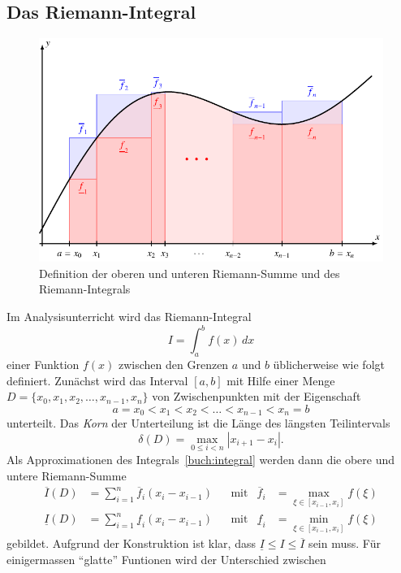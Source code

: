 \subsection{Das Riemann-Integral
\label{buch:subsection:riemann}}
\begin{figure}
\centering
\includegraphics{chapters/40-integration/figures/riemann.pdf}
\caption{Definition der oberen und unteren Riemann-Summe und des
Riemann-Integrals
\label{buch:figure:riemann}}
\end{figure}
Im Analysisunterricht wird das Riemann-Integral
\begin{equation}
I = \int_a^b f(x)\,dx
\label{buch:integral}
\end{equation}
einer Funktion $f(x)$ zwischen den Grenzen $a$ und $b$ üblicherweise
wie folgt definiert.
Zunächst wird das Interval $[a,b]$ mit Hilfe einer Menge
$D=\{x_0,x_1,x_2,\dots,x_{n-1}, x_n\}$
von Zwischenpunkten mit der Eigenschaft
\[
a=x_0 < x_1 < x_2 < \dots < x_{n-1} < x_n = b
\]
unterteilt.
Das {\em Korn} der Unterteilung ist die Länge des längsten Teilintervals
\[
\delta(D) = \max_{0\le i< n} |x_{i+1}-x_i|.
\]
Als Approximationen des Integrals~\eqref{buch:integral} werden dann die
obere und untere Riemann-Summe
\begin{align*}
\overline{I}(D)
&=
\sum_{i=1}^n \overline{f}_i (x_i-x_{i-1})
&&\text{mit}
&\overline{f}_i
&=
\max_{\xi\in [x_{i-1},x_i]} f(\xi)
\\
\underline{I}(D)
&=
\sum_{i=1}^n \underline{f}_i (x_i-x_{i-1})
&&\text{mit}
&\underline{f}_i
&=
\min_{\xi\in [x_{i-1},x_i]} f(\xi)
\end{align*}
gebildet.
Aufgrund der Konstruktion ist klar, dass $\underline{I} \le I \le \overline{I}$
sein muss.
Für einigermassen ``glatte'' Funtionen wird der Unterschied zwischen
